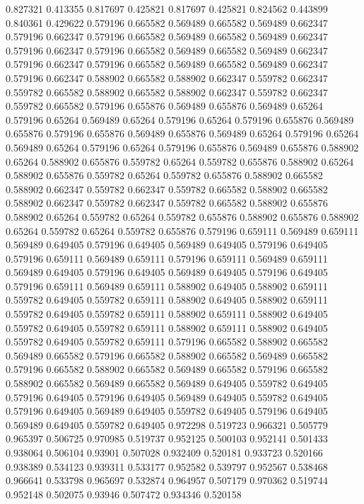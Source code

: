 0.827321 0.413355
0.817697 0.425821
0.817697 0.425821
0.824562 0.443899
0.840361 0.429622
0.579196 0.665582
0.569489 0.665582
0.569489 0.662347
0.579196 0.662347
0.579196 0.665582
0.569489 0.665582
0.569489 0.662347
0.579196 0.662347
0.579196 0.665582
0.569489 0.665582
0.569489 0.662347
0.579196 0.662347
0.579196 0.665582
0.569489 0.665582
0.569489 0.662347
0.579196 0.662347
0.588902 0.665582
0.588902 0.662347
0.559782 0.662347
0.559782 0.665582
0.588902 0.665582
0.588902 0.662347
0.559782 0.662347
0.559782 0.665582
0.579196 0.655876
0.569489 0.655876
0.569489 0.65264
0.579196 0.65264
0.569489 0.65264
0.579196 0.65264
0.579196 0.655876
0.569489 0.655876
0.579196 0.655876
0.569489 0.655876
0.569489 0.65264
0.579196 0.65264
0.569489 0.65264
0.579196 0.65264
0.579196 0.655876
0.569489 0.655876
0.588902 0.65264
0.588902 0.655876
0.559782 0.65264
0.559782 0.655876
0.588902 0.65264
0.588902 0.655876
0.559782 0.65264
0.559782 0.655876
0.588902 0.665582
0.588902 0.662347
0.559782 0.662347
0.559782 0.665582
0.588902 0.665582
0.588902 0.662347
0.559782 0.662347
0.559782 0.665582
0.588902 0.655876
0.588902 0.65264
0.559782 0.65264
0.559782 0.655876
0.588902 0.655876
0.588902 0.65264
0.559782 0.65264
0.559782 0.655876
0.579196 0.659111
0.569489 0.659111
0.569489 0.649405
0.579196 0.649405
0.569489 0.649405
0.579196 0.649405
0.579196 0.659111
0.569489 0.659111
0.579196 0.659111
0.569489 0.659111
0.569489 0.649405
0.579196 0.649405
0.569489 0.649405
0.579196 0.649405
0.579196 0.659111
0.569489 0.659111
0.588902 0.649405
0.588902 0.659111
0.559782 0.649405
0.559782 0.659111
0.588902 0.649405
0.588902 0.659111
0.559782 0.649405
0.559782 0.659111
0.588902 0.659111
0.588902 0.649405
0.559782 0.649405
0.559782 0.659111
0.588902 0.659111
0.588902 0.649405
0.559782 0.649405
0.559782 0.659111
0.579196 0.665582
0.588902 0.665582
0.569489 0.665582
0.579196 0.665582
0.588902 0.665582
0.569489 0.665582
0.579196 0.665582
0.588902 0.665582
0.569489 0.665582
0.579196 0.665582
0.588902 0.665582
0.569489 0.665582
0.569489 0.649405
0.559782 0.649405
0.579196 0.649405
0.579196 0.649405
0.569489 0.649405
0.559782 0.649405
0.579196 0.649405
0.569489 0.649405
0.559782 0.649405
0.579196 0.649405
0.569489 0.649405
0.559782 0.649405
0.972298 0.519723
0.966321 0.505779
0.965397 0.506725
0.970985 0.519737
0.952125 0.500103
0.952141 0.501433
0.938064 0.506104
0.93901 0.507028
0.932409 0.520181
0.933723 0.520166
0.938389 0.534123
0.939311 0.533177
0.952582 0.539797
0.952567 0.538468
0.966641 0.533798
0.965697 0.532874
0.964957 0.507179
0.970362 0.519744
0.952148 0.502075
0.93946 0.507472
0.934346 0.520158
